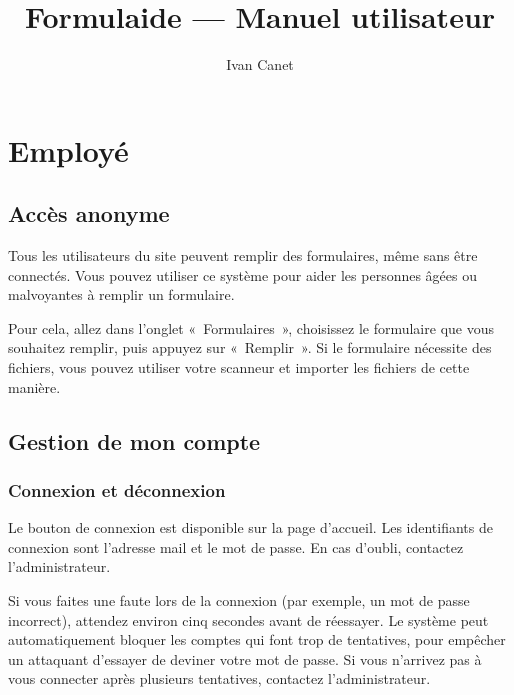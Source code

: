 \documentclass[11pt,french]{memoir}
\begin{document}
	\renewcommand{\chaptername}{Partie}

	\frontmatter
	\title{Formulaide --- Manuel utilisateur}
	\author{Ivan Canet}
	\maketitle

	\tableofcontents

	\mainmatter


	\chapter{Employé}\label{ch:employee}


	\section{Accès anonyme}\label{sec:anonymous}

	Tous les utilisateurs du site peuvent remplir des formulaires, même sans être connectés.
	Vous pouvez utiliser ce système pour aider les personnes âgées ou malvoyantes à remplir un formulaire.

	Pour cela, allez dans l'onglet «~Formulaires~», choisissez le formulaire que vous souhaitez remplir, puis appuyez sur «~Remplir~».
	Si le formulaire nécessite des fichiers, vous pouvez utiliser votre scanneur et importer les fichiers de cette manière.


	\section{Gestion de mon compte}\label{sec:account}

	\subsection{Connexion et déconnexion}\label{subsec:login}

	Le bouton de connexion est disponible sur la page d'accueil.
	Les identifiants de connexion sont l'adresse mail et le mot de passe.
	En cas d'oubli, contactez l'administrateur.

	Si vous faites une faute lors de la connexion (par exemple, un mot de passe incorrect), attendez environ cinq secondes avant de réessayer.
	Le système peut automatiquement bloquer les comptes qui font trop de tentatives, pour empêcher un attaquant d'essayer de deviner votre mot de passe.
	Si vous n'arrivez pas à vous connecter après plusieurs tentatives, contactez l'administrateur.
\end{document}
